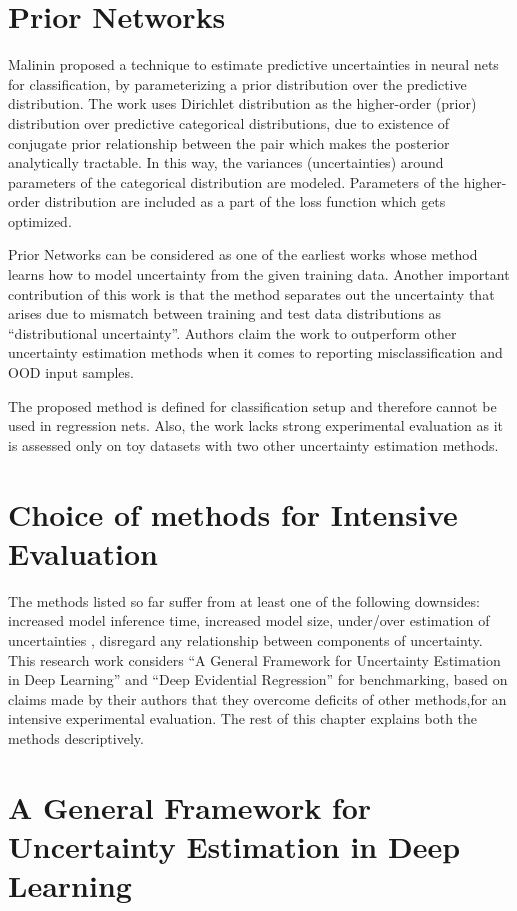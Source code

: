	\section{Prior Networks}
	Malinin \etal  \cite{malinin2018predictive} proposed a technique to estimate predictive uncertainties in neural nets for classification, by parameterizing a prior distribution over the predictive distribution. The work uses Dirichlet distribution as the higher-order (prior) distribution over predictive categorical distributions, due to existence of  conjugate prior relationship between the pair which makes the posterior analytically tractable. In this way, the variances (uncertainties) around parameters of the categorical distribution are modeled. Parameters of the higher-order distribution are included as a part of the loss function which gets optimized.
	
	 Prior Networks can be considered as one of the earliest works whose method learns how to model uncertainty from the given training data. Another important contribution of this work is that the method separates out the uncertainty that arises due to mismatch between training and test data distributions as \enquote{distributional uncertainty}. Authors claim the work to outperform other uncertainty estimation methods when it comes to reporting misclassification and OOD input samples.
	
	
	The proposed method is defined for classification setup and therefore cannot be used in regression nets. Also, the work lacks strong experimental evaluation as it is assessed only on toy datasets with two other uncertainty estimation methods.
	
	\section{Choice of methods for Intensive Evaluation}
	The methods listed so far suffer from at least one of the following downsides: increased model inference time, increased model size, under/over estimation of uncertainties , disregard any relationship between components of uncertainty. This research work considers \enquote{A General Framework for Uncertainty Estimation in Deep Learning} \cite{loquercio2020a} and \enquote{Deep Evidential Regression} \cite{amini2020deep} for benchmarking, based on claims made by their authors that they overcome deficits of other methods,for an intensive experimental evaluation. The rest of this chapter explains both the methods descriptively.
	\section{A General Framework for Uncertainty Estimation in Deep Learning}\label{general_framework}
